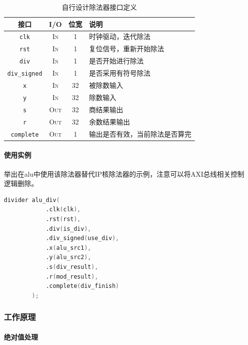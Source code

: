 \documentclass[UTF-8,twoside,c5size]{ctexart}
\begin{document}
	\begin{table}[!h]
		\begin{center}
			\caption{自行设计除法器接口定义}
			\begin{tabularx}{\textwidth}{|c|c|c|Y|}
				\hline
				\textbf{接口} & \textbf{I/O} & \textbf{位宽} & \textbf{说明} \\
				\hline
				\texttt{clk} & \textsc{In} & 1 & 时钟驱动，迭代除法 \\
				\hline
				\texttt{rst} & \textsc{In} & 1 & 复位信号，重新开始除法 \\
				\hline
				\texttt{div} & \textsc{In} & 1 & 是否开始进行除法 \\
				\hline
				\texttt{div\_signed} & \textsc{In} & 1 & 是否采用有符号除法 \\
				\hline
				\texttt{x} & \textsc{In} & 32 & 被除数输入 \\
				\hline
				\texttt{y} & \textsc{In} & 32 & 除数输入 \\
				\hline
				\texttt{s} & \textsc{Out} & 32 & 商结果输出 \\
				\hline
				\texttt{r} & \textsc{Out} & 32 & 余数结果输出 \\
				\hline
				\texttt{complete} & \textsc{Out} & 1 & 输出是否有效，当前除法是否算完 \\
				\hline
			\end{tabularx}
		\end{center}
	\end{table}

	\paragraph{使用实例}\hfill
	
	举出在alu中使用该除法器替代IP核除法器的示例，注意可以将AXI总线相关控制逻辑删除。
	
	\begin{lstlisting}[language=verilog]
		divider alu_div(
			.clk(clk),
			.rst(rst),
			.div(is_div),
			.div_signed(use_div),
			.x(alu_src1),
			.y(alu_src2),
			.s(div_result),
			.r(mod_result),
			.complete(div_finish)
		);
	\end{lstlisting}

	\subsubsection{工作原理}
	
	\paragraph{绝对值处理}\hfill
	
\end{document}
